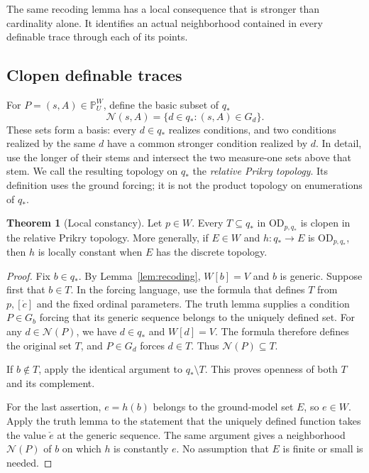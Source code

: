 \documentclass[11pt,letterpaper]{article}
\theoremstyle{definition}
\newtheorem{theorem}[definition]{Theorem}
\numberwithin{equation}{section}
\newcommand{\OD}{\mathrm{OD}}
\newcommand{\PP}{\mathbb P}
\begin{document}
The same recoding lemma has a local consequence that is stronger than
cardinality alone. It identifies an actual neighborhood contained in every
definable trace through each of its points.

\subsection{Clopen definable traces}

For $P=(s,A)\in\PP_U^W$, define the basic subset of $q_*$
\[
      \mathcal N(s,A)=\{d\in q_*:(s,A)\in G_d\}.
\]
These sets form a basis: every $d\in q_*$ realizes conditions, and two
conditions realized by the same $d$ have a common stronger condition
realized by $d$. In detail, use the longer of their stems and intersect
the two measure-one sets above that stem. We call the resulting topology
on $q_*$ the \emph{relative Prikry topology}. Its definition uses the ground
forcing; it is not the product topology on enumerations of $q_*$.

\begin{theorem}[Local constancy]\label{thm:clopen}
Let $p\in W$.
Every $T\subseteq q_*$ in $\OD_{p,q_*}$ is clopen in the relative Prikry
topology. More generally, if $E\in W$ and
$h:q_*\to E$ is $\OD_{p,q_*}$, then $h$ is locally constant when $E$ has the
discrete topology.
\end{theorem}

\begin{proof}
Fix $b\in q_*$. By Lemma~\ref{lem:recoding}, $W[b]=V$ and $b$ is generic.
Suppose first that $b\in T$. In the forcing language, use the formula
that defines $T$ from $p,[\dot c]$ and the fixed ordinal parameters. The
truth lemma supplies a condition $P\in G_b$ forcing that its generic
sequence belongs to the uniquely defined set. For any $d\in\mathcal N(P)$,
we have $d\in q_*$ and $W[d]=V$. The formula therefore defines the original
set $T$, and $P\in G_d$ forces $d\in T$. Thus
$\mathcal N(P)\subseteq T$.

If $b\notin T$, apply the identical argument to $q_*\setminus T$.
This proves openness of both $T$ and its complement.

For the last assertion, $e=h(b)$ belongs to the ground-model set $E$,
so $e\in W$. Apply the truth lemma to the statement that the uniquely
defined function takes the value $\check e$ at the generic sequence.
The same argument gives a neighborhood $\mathcal N(P)$ of $b$ on which
$h$ is constantly $e$. No assumption that $E$ is finite or small is needed.
\end{proof}
\end{document}
